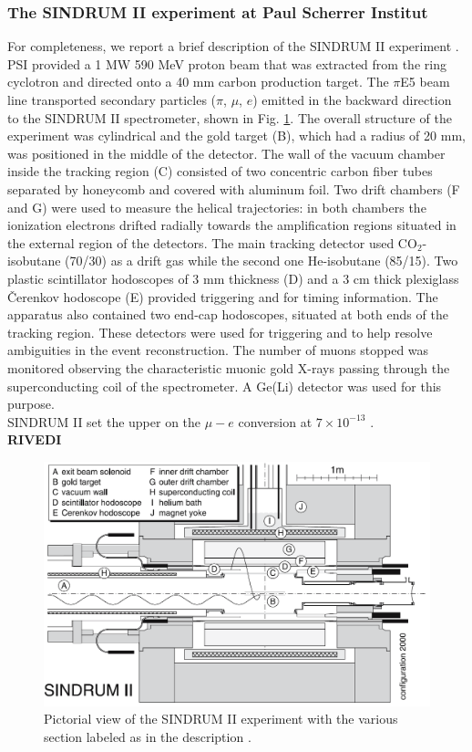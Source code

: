 \documentclass[12pt,a4paper,openright, oneside, titlepage]{book} %
\begin{document}
\subsubsection{The SINDRUM II experiment at Paul Scherrer Institut}
For completeness, we report a brief description of the SINDRUM II experiment \cite{SINDRUMII}. 
PSI provided a 1 MW 590 MeV proton beam that was extracted from the ring cyclotron 
and directed onto a 40 mm carbon production target. 
The $\pi$E5 beam line transported secondary particles ($\pi$, $\mu$, $e$) 
emitted in the backward direction to the SINDRUM II spectrometer, shown in Fig. \ref{_SINDRUM_II}.
The overall structure of the experiment was cylindrical and the gold target (B), 
which had a radius of 20 mm, was positioned in the middle of the detector.
The wall of the vacuum chamber inside the tracking region (C) consisted 
of two concentric carbon fiber tubes separated by honeycomb 
and covered with aluminum foil. 
Two drift chambers (F and G) were used to measure the helical trajectories: 
in both chambers the ionization electrons drifted radially towards the amplification regions 
situated in the external region of the detectors. 
The main tracking detector used CO$_2$-isobutane (70/30) as a drift gas while the second one He-isobutane (85/15).
Two plastic scintillator hodoscopes of 3 mm thickness (D) and a 3 cm thick plexiglass \v{C}erenkov hodoscope (E) 
provided triggering and for timing information. 
The apparatus also contained two end-cap hodoscopes, situated at both ends of the tracking region. 
These detectors were used for triggering and to help resolve ambiguities in the event reconstruction. 
The number of muons stopped was monitored observing the characteristic muonic gold X-rays passing through the superconducting coil of the spectrometer. A Ge(Li) detector was used for this purpose.\\
SINDRUM II set the upper on the $\mu-e$ conversion at $7\times10^{-13}$ \cite{SINDRUMII}.\\
\textbf{RIVEDI}

\begin{figure}[h!]
\centering
\includegraphics[scale=0.6]{SINDRUM_II}
\caption[SINDRUM II]{Pictorial view of the SINDRUM II experiment with the various section labeled as in the description \cite{SINDRUMII}.}
\label{_SINDRUM_II}
\end{figure}
\end{document}

